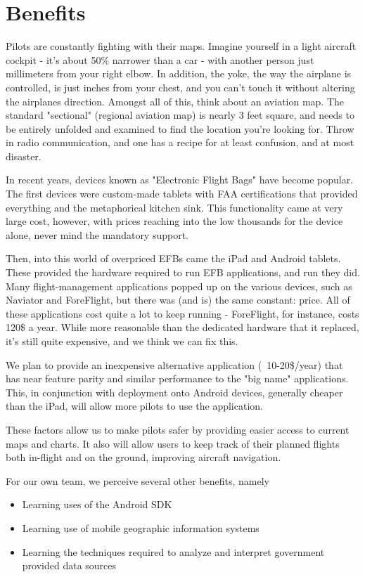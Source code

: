 \documentclass[10pt,a4paper]{report}
\begin{document}
\section{Benefits}
Pilots are constantly fighting with their maps. Imagine yourself in a light aircraft cockpit - it's about 50\% narrower than a car - with another person just millimeters from your right elbow. In addition, the yoke, the way the airplane is controlled, is just inches from your chest, and you can't touch it without altering the airplanes direction. Amongst all of this, think about an aviation map. The standard "sectional" (regional aviation map) is nearly 3 feet square, and needs to be entirely unfolded and examined to find the location you're looking for. Throw in radio communication, and one has a recipe for at least confusion, and at most disaster. 

In recent years, devices known as "Electronic Flight Bags" have become popular. The first devices were custom-made tablets with FAA certifications that provided everything and the metaphorical kitchen sink. This functionality came at very large cost, however, with prices reaching into the low thousands for the device alone, never mind the mandatory support.

Then, into this world of overpriced EFBs came the iPad and Android tablets. These provided the hardware required to run EFB applications, and run they did. Many flight-management applications popped up on the various devices, such as Naviator and ForeFlight, but there was (and is) the same constant: price. All of these applications cost quite a lot to keep running - ForeFlight, for instance, costs 120\$ a year. While more reasonable than the dedicated hardware that it replaced, it's still quite expensive, and we think we can fix this.

We plan to provide an inexpensive alternative application (~10-20\$/year) that has near feature parity and similar performance to the "big name" applications. This, in conjunction with deployment onto Android devices, generally cheaper than the iPad, will allow more pilots to use the application.

These factors allow us to make pilots safer by providing easier access to current maps and charts. It also will allow users to keep track of their planned flights both in-flight and on the ground, improving aircraft navigation.

For our own team, we perceive several other benefits, namely
\begin{itemize}
\item Learning uses of the Android SDK
\item Learning use of mobile geographic information systems
\item Learning the techniques required to analyze and interpret government provided data sources
\end{itemize}
\end{document}
